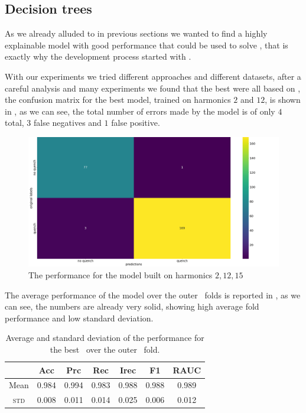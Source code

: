 \subsection{Decision trees}
As we already alluded to in previous sections we wanted to find a highly explainable model with good
performance that could be used to solve \qrp, that is exactly why the development process started
with \dts.

With our experiments we tried different approaches and different datasets, after a careful analysis
and many experiments we found that the best \dts were all based on \an, the confusion matrix for
the best model, trained on harmonics $2$ and $12$, is shown in , as we can
see, the total number of errors made by the model is of only $4$ total, $3$ false negatives and $1$
false positive.
\begin{figure}[h!]
	\centering
	\includegraphics[width=\linewidth]{img/An_2_12_cm_dt.png}
	\caption{The performance for the \an model built on harmonics $2, 12, 15$}
	\label{fig:dt-an-2-12-cm}
\end{figure}
The average performance of the model over the outer \cv\ folds is reported in ,
as we can see, the numbers are already very solid, showing high average fold performance and low
standard deviation.
\begin{table}[t]
	\caption{Average and standard deviation of the performance for the best \dt\ over the outer \cv\
		fold.}\label{tbl:an-2-12-perf}

	\bigskip
	\setlength{\tabcolsep}{6pt}
	\centering
	\begin{tabular}{ccccccc}
		\toprule
		\textbf{}    & \textbf{Acc} & \textbf{Prc} & \textbf{Rec} & \textbf{Irec} & \textbf{F1} & \textbf{RAUC} \\
		\midrule
		Mean         & 0.984        & 0.994        & 0.983        & 0.988         & 0.988
		             & 0.989                                                                                    \\
		\textsc{std} & 0.008        & 0.011        & 0.014        & 0.025         & 0.006
		             & 0.012                                                                                    \\
		\bottomrule
	\end{tabular}
\end{table}
